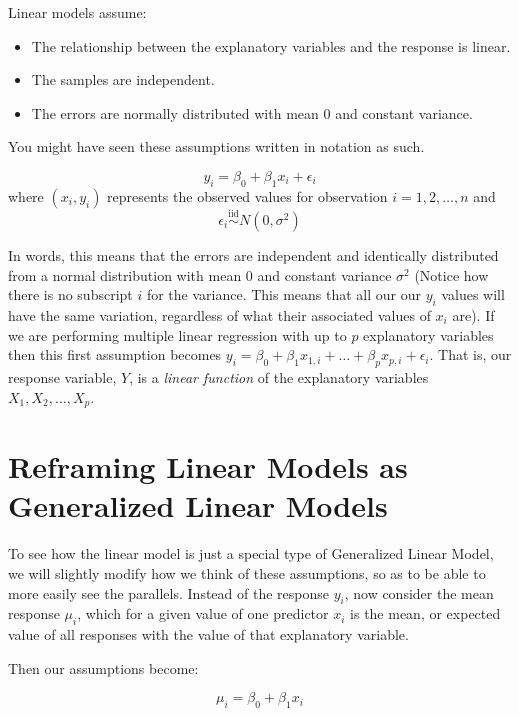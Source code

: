 \documentclass[
]{book}
\providecommand{\tightlist}{%
  \setlength{\itemsep}{0pt}\setlength{\parskip}{0pt}}
\begin{document}
Linear models assume:

\begin{itemize}
\tightlist
\item
  The relationship between the explanatory variables and the response is linear.
\item
  The samples are independent.
\item
  The errors are normally distributed with mean 0 and constant variance.
\end{itemize}

You might have seen these assumptions written in notation as such.

\[y_i  = \beta_0 + \beta_1 x_i + \epsilon_i \]
where \((x_i, y_i)\) represents the observed values for observation \(i = 1, 2, \ldots, n\) and
\[ \epsilon_i \overset{\text{iid}}{\sim} N(0,\sigma^2)\]

In words, this means that the errors are independent and identically distributed from a normal distribution with mean 0 and constant variance \(\sigma^2\) (Notice how there is no subscript \(i\) for the variance. This means that all our our \(y_i\) values will have the same variation, regardless of what their associated values of \(x_i\) are). If we are performing multiple linear regression with up to \(p\) explanatory variables then this first assumption becomes \(y_i = \beta_0 + \beta_1 x_{1,i} + \ldots + \beta_p x_{p,i} + \epsilon_i\). That is, our response variable, \(Y\), is a \emph{linear function} of the explanatory variables \(X_1, X_2, \ldots, X_p\).

\hypertarget{reframing-linear-model}{%
\section{Reframing Linear Models as Generalized Linear Models}\label{reframing-linear-model}}

To see how the linear model is just a special type of Generalized Linear Model, we will slightly modify how we think of these assumptions, so as to be able to more easily see the parallels. Instead of the response \(y_i\), now consider the mean response \(\mu_i\), which for a given value of one predictor \(x_i\) is the mean, or expected value of all responses with the value of that explanatory variable.

Then our assumptions become:

\begin{equation}
\mu_i = \beta_0 + \beta_1 x_i \label{eq:systematic-linear}
\end{equation}
\end{document}
